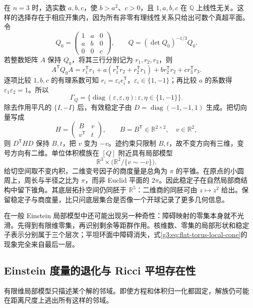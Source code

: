 \begin{example}\label{g3:exm:flat-torus-stabilizer-cone}
	在 \(n=3\) 时，选实数 \(a,b,c\)，使 \(b>a^2\)、\(c>0\)，且 \(1,a,b,c\) 在 \(\mathbb Q\) 上线性无关。这样的选择存在于相应开集内，因为所有非零有理线性关系只给出可数个真超平面。令
	\[
		Q_0=\begin{pmatrix}1&a&0\\a&b&0\\0&0&c\end{pmatrix},
		\qquad Q=(\det Q_0)^{-1/3}Q_0.
	\]
	若整数矩阵 \(A\) 保持 \(Q_0\)，将其三行分别记为 \(r_1,r_2,r_3\)，则
	\[
		A^{\mathsf T}Q_0A
		=r_1^{\mathsf T}r_1
		+a(r_1^{\mathsf T}r_2+r_2^{\mathsf T}r_1)
		+b r_2^{\mathsf T}r_2+c r_3^{\mathsf T}r_3.
	\]
	逐项比较 \(1,b,c\) 的有理系数可知 \(r_i=\varepsilon_i e_i^{\mathsf T}\)，\(\varepsilon_i\in\{1,-1\}\)；再比较 \(a\) 的系数得 \(\varepsilon_1\varepsilon_2=1\)。所以
	\[
		\Gamma_Q=\{\operatorname{diag}(\varepsilon,\varepsilon,\eta):
		\varepsilon,\eta\in\{1,-1\}\}.
	\]
	除去作用平凡的 \(\{I,-I\}\) 后，有效稳定子由 \(D=\operatorname{diag}(-1,-1,1)\) 生成。把切向量写成
	\[
		H=\begin{pmatrix}B&v\\v^{\mathsf T}&t\end{pmatrix},
		\qquad B=B^{\mathsf T}\in\mathbb R^{2\times2},\quad v\in\mathbb R^2,
	\]
	则 \(D^{\mathsf T}HD\) 保持 \(B,t\)，把 \(v\) 变为 \(-v\)。迹约束只限制 \(B,t\)，故不变方向有三维，变号方向有二维。单位体积模族在 \([Q]\) 附近具有局部模型
	\begin{equation}\label{g3:eq:flat-torus-local-cone}
		\mathbb R^3\times\bigl(\mathbb R^2/\{v\sim-v\}\bigr).
	\end{equation}
	给切空间取不变内积，二维变号因子的商度量是总角为 \(\pi\) 的平锥。在原点的小圆周上，周长与半径之比为 \(\pi\)，而非 Euclid 平面的 \(2\pi\)。因此稳定子在自然局部商结构中留下锥角。其底层拓扑空间仍同胚于 \(\mathbb R^5\)：二维商的同胚可由 \(z\mapsto z^2\) 给出。保留稳定子与商度量，比只问底层集合是否像一个开球记录了更多几何信息。
\end{example}

在一般 Einstein 局部模型中还可能出现另一种奇性：障碍映射的零集本身就不光滑。先得到有限维零集，再识别剩余等距群作用。核维数、零集的局部形状和稳定子表示分别属于三个层次；平坦环面中障碍消失，式\eqref{g3:eq:flat-torus-local-cone}的现象完全来自最后一层。

\subsection{Einstein 度量的退化与 Ricci 平坦存在性}
\label{g3:subsec:2504:03}
有限维局部模型只描述某个解的邻域。即使方程和体积归一化都固定，解族仍可能在距离尺度上逃出所有这样的邻域。

